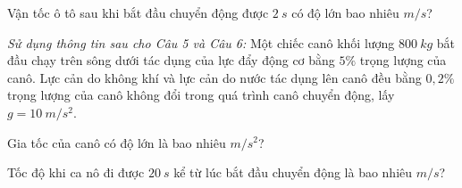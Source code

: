 \begin{ex}%
Vận tốc ô tô sau khi bắt đầu chuyển động được $2\ s$ có độ lớn bao nhiêu $m/s$?
 \end{ex}
\textit{Sử dụng thông tin sau cho Câu 5 và Câu 6:} Một chiếc canô khối lượng $800\ kg$ bắt đầu chạy trên sông dưới tác dụng của lực đẩy động cơ bằng $5 \%$ trọng lượng của canô. Lực cản do không khí và lực cản do nước tác dụng lên canô đều bằng $0,2 \%$ trọng lượng của canô không đổi trong quá trình canô chuyển động, lấy $g=10\ m/s^2$.
\begin{ex}%
Gia tốc của canô có độ lớn là bao nhiêu $m/s^2$?
\end{ex}
\begin{ex}%
Tốc độ khi ca nô đi được $20\ s$ kể từ lúc bắt đầu chuyển động là bao nhiêu $m/s$?
 \end{ex}









